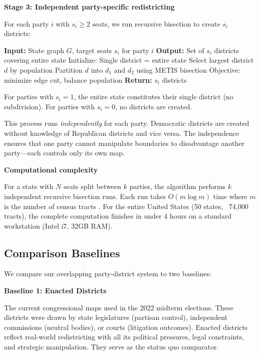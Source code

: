\textbf{Stage 3: Independent party-specific redistricting}

For each party $i$ with $s_i \geq 2$ seats, we run recursive bisection to create $s_i$ districts:

\begin{algorithm}[H]
\caption{Party-Specific Recursive Bisection}
\begin{algorithmic}[1]
\State \textbf{Input:} State graph $G$, target seats $s_i$ for party $i$
\State \textbf{Output:} Set of $s_i$ districts covering entire state
\State Initialize: Single district = entire state
    \State Select largest district $d$ by population
    \State Partition $d$ into $d_1$ and $d_2$ using METIS bisection \citep{karypis1998metis}
    \State Objective: minimize edge cut, balance population
\EndWhile
\State \textbf{Return:} $s_i$ districts
\end{algorithmic}
\end{algorithm}

For parties with $s_i = 1$, the entire state constitutes their single district (no subdivision). For parties with $s_i = 0$, no districts are created.

This process runs \emph{independently} for each party. Democratic districts are created without knowledge of Republican districts and vice versa. The independence ensures that one party cannot manipulate boundaries to disadvantage another party—each controls only its own map.

\textbf{Computational complexity}

For a state with $N$ seats split between $k$ parties, the algorithm performs $k$ independent recursive bisection runs. Each run takes $O(m \log m)$ time where $m$ is the number of census tracts \citep{karypis1998metis}. For the entire United States (50 states, ~74,000 tracts), the complete computation finishes in under 4 hours on a standard workstation (Intel i7, 32GB RAM).

\subsection{Comparison Baselines}

We compare our overlapping party-district system to two baselines:

\textbf{Baseline 1: Enacted Districts}

The current congressional maps used in the 2022 midterm elections. These districts were drawn by state legislatures (partisan control), independent commissions (neutral bodies), or courts (litigation outcomes). Enacted districts reflect real-world redistricting with all its political pressures, legal constraints, and strategic manipulation. They serve as the status quo comparator.

